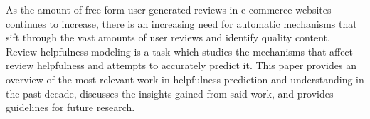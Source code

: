 As the amount of free-form user-generated reviews in e-commerce websites continues to increase, there is an increasing need for automatic mechanisms that sift through the vast amounts of user reviews and identify quality content. Review helpfulness modeling is a task which studies the mechanisms that affect review helpfulness and attempts to accurately predict it. This paper provides an overview of the most relevant work in helpfulness prediction and understanding in the past decade, discusses the insights gained from said work, and provides guidelines for future research.
